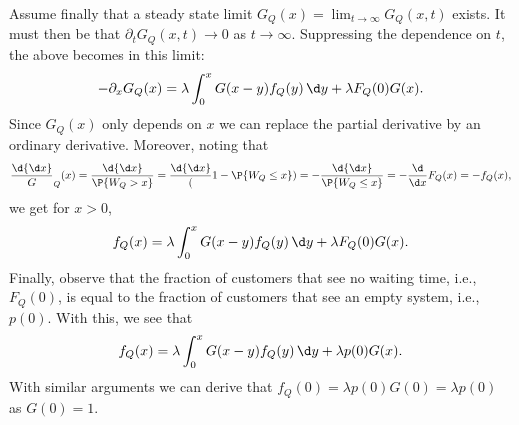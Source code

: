 Assume finally that a steady state limit $G_Q(x) = \lim_{t\to
\infty} G_Q(x,t)$ exists. It must then be that $\partial_t
G_Q(x, t) \to 0$ as $t\to \infty$. Suppressing the dependence on
$t$, the above becomes in this limit:
%
\begin{equation*}
- \partial_x G_Q(x) = \lambda \int_0^x G(x-y) f_Q(y) \,\d y + \lambda F_Q(0) G(x).
\end{equation*}
Since $G_Q(x)$ only depends on $x$ we can
replace the partial derivative by an ordinary derivative. Moreover,
noting that
%
\begin{equation*}
\frac \d{\d x} G_Q(x) = \frac \d{\d x} \P{W_Q > x} = \frac \d{\d x}
(1-\P{W_Q \leq x}) = - \frac \d{\d x} \P{W_Q \leq x} = -\frac{\d}{\d x}F_Q(x) = - f_Q(x),
\end{equation*}
we get for $x>0$,
%
\begin{equation*}
f_Q(x) = \lambda \int_0^x G(x-y) f_Q(y) \,\d y + \lambda F_Q(0) G(x).
\end{equation*}
Finally, observe that the fraction of customers that see no waiting
time, i.e., $F_Q(0)$, is equal to the fraction of customers that
see an empty system, i.e., $p(0)$. With this, we see that
%
\begin{equation*}
f_Q(x) = \lambda \int_0^x G(x-y) f_Q(y) \,\d y + \lambda p(0) G(x).
\end{equation*}
With similar arguments we can derive that $f_Q(0) = \lambda p(0) G(0) = \lambda p(0)$ as $G(0) = 1$.

